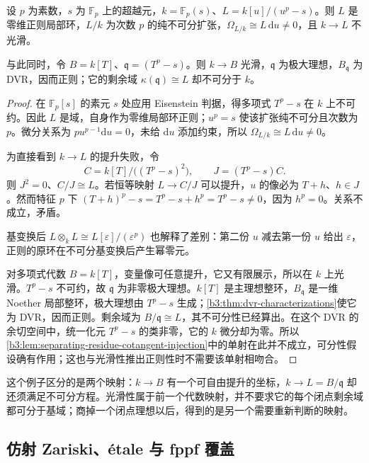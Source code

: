 \begin{example}\label{b3:exm:regular-not-smooth-imperfect}\label{b3:exm:smooth-inseparable-closed-point}
	设 \(p\) 为素数，\(s\) 为 \(\mathbb F_p\) 上的超越元，\(k=\mathbb F_p(s)\)、\(L=k[u]/(u^p-s)\)。则 \(L\) 是零维正则局部环，\(L/k\) 为次数 \(p\) 的纯不可分扩张，\(\Omega_{L/k}\cong L\,\mathrm du\ne0\)，且 \(k\to L\) 不光滑。

	与此同时，令 \(B=k[T]\)、\(\mathfrak q=(T^p-s)\)。则 \(k\to B\) 光滑，\(\mathfrak q\) 为极大理想，\(B_{\mathfrak q}\) 为 DVR，因而正则；它的剩余域 \(\kappa(\mathfrak q)\cong L\) 却不可分于 \(k\)。
\end{example}
\begin{proof}
	在 \(\mathbb F_p[s]\) 的素元 \(s\) 处应用 Eisenstein 判据，得多项式 \(T^p-s\) 在 \(k\) 上不可约。因此 \(L\) 是域，自身作为零维局部环正则；\(u^p=s\) 使该扩张纯不可分且次数为 \(p\)。微分关系为 \(p u^{p-1}\mathrm du=0\)，未给 \(\mathrm du\) 添加约束，所以 \(\Omega_{L/k}\cong L\,\mathrm du\ne0\)。

	为直接看到 \(k\to L\) 的提升失败，令
	\[
		C=k[T]/\bigl((T^p-s)^2\bigr),\qquad J=(T^p-s)C.
	\]
	则 \(J^2=0\)、\(C/J\cong L\)。若恒等映射 \(L\to C/J\) 可以提升，\(u\) 的像必为 \(T+h\)、\(h\in J\)。然而特征 \(p\) 下 \((T+h)^p-s=T^p-s+h^p=T^p-s\ne0\)，因为 \(h^p=0\)。关系不成立，矛盾。

	基变换后 \(L\otimes_kL\cong L[\varepsilon]/(\varepsilon^p)\) 也解释了差别：第二份 \(u\) 减去第一份 \(u\) 给出 \(\varepsilon\)，正则的原环在不可分基变换后产生幂零元。

	对多项式代数 \(B=k[T]\)，变量像可任意提升，它又有限展示，所以在 \(k\) 上光滑。\(T^p-s\) 不可约，故 \(\mathfrak q\) 为非零极大理想。\(k[T]\) 是主理想整环，\(B_{\mathfrak q}\) 是一维 Noether 局部整环，极大理想由 \(T^p-s\) 生成；\cref{b3:thm:dvr-characterizations}使它为 DVR，因而正则。剩余域为 \(B/\mathfrak q\cong L\)，其不可分性已经算出。在这个 DVR 的余切空间中，统一化元 \(T^p-s\) 的类非零，它的 \(k\) 微分却为零。所以\cref{b3:lem:separating-residue-cotangent-injection}中的单射在此并不成立，可分性假设确有作用；这也与光滑性推出正则性时不需要该单射相吻合。
\end{proof}

这个例子区分的是两个映射：\(k\to B\) 有一个可自由提升的坐标，\(k\to L=B/\mathfrak q\) 却还须满足不可分方程。光滑性属于前一个代数映射，并不要求它的每个闭点剩余域都可分于基域；商掉一个闭点理想以后，得到的是另一个需要重新判断的映射。

\subsection{仿射 Zariski、étale 与 fppf 覆盖}
\label{b3:subsec:2304:03}
\label{b3:subsec:affine-zariski-etale-fppf-covers}

